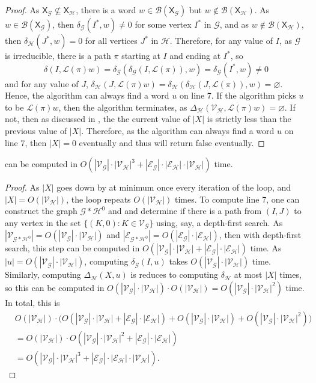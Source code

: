\documentclass[hidelinks]{article}
\newcommand{\Lc}{\mathcal{L}}  %
\newcommand{\Gc}{\mathcal{G}}  %
\newcommand{\Hc}{\mathcal{H}}  %
\newcommand{\Vc}{\mathcal{V}}
\newcommand{\Ec}{\mathcal{E}}
\newcommand{\Bc}{\mathcal{B}}
\newcommand{\shift}[1]{\mathsf{X}_{#1}}
\theoremstyle{definition}
\begin{document}
\begin{proof}
    As \(\shift{\Gc} \nsubseteq \shift{\Hc}\), there is a word \(w \in \Bc(\shift{\Gc})\)
    but \(w \notin \Bc(\shift{\Hc})\). As \(w \in \Bc(\shift{\Gc})\), then \(\delta_\Gc(I^*, w) \neq 0\)
    for some vertex \(I^*\) in \(\Gc\), and as \(w \notin \Bc(\shift{\Hc})\), then 
    \(\delta_\Hc(J^*, w) = 0\) for all vertices \(J^*\) in \(\Hc\). Therefore, for 
    any value of \(I\), as \(\Gc\) is irreducible, there is a path 
    \(\pi\) starting at \(I\) and ending at \(I^*\), so 
    \[\delta(I, \Lc(\pi)w) = \delta_\Gc(\delta_\Gc(I, \Lc(\pi)), w) = \delta_\Gc(I^*, w) \neq 0\]
    and for any value of \(J\), \(\delta_\Hc(J, \Lc(\pi)w) = \delta_\Hc(\delta_\Hc(J, \Lc(\pi)), w) = \varnothing\).
    Hence, the algorithm can always find a word \(u\) on line 7. If the algorithm picks \(u\) to be \(\Lc(\pi)w\), 
    then the algorithm terminates, as \(\Delta_\Hc(\Vc_\Hc, \Lc(\pi)w) = \varnothing\).
    If not, then as discussed in , the the current value of \(|X|\)
    is strictly less than the previous value of \(|X|\). Therefore, as the algorithm 
    can always find a word \(u\) on line 7, then \(|X| = 0\) eventually and 
    thus will return false eventually. 
\end{proof}

\begin{theorem}
     can be computed in \(O(|\Vc_\Gc|\cdot|\Vc_\Hc|^3 + |\Ec_\Gc|\cdot|\Ec_\Hc|\cdot|\Vc_\Hc|)\) time.
\end{theorem}

\begin{proof}
    As \(|X|\) goes down by at minimum once every iteration of the loop, 
    and \(|X| = O(|\Vc_\Hc|)\), the loop repeats \(O(|\Vc_\Hc|)\) times. To compute line 7, 
    one can construct the graph \(\Gc * \Hc^0\) and and determine 
    if there is a path from \((I, J)\) to any vertex in the set 
    \(\{(K, 0) : K \in \Vc_\Gc\}\) using, say, a depth-first search.
    As \(|\Vc_{\Gc * \Hc^0}| = O(|\Vc_\Gc|\cdot|\Vc_\Hc|)\) and 
    \(|\Ec_{\Gc * \Hc^0}| = O(|\Ec_\Gc|\cdot|\Ec_\Hc|)\), then with 
    depth-first search, this step can be computed in \(O(|\Vc_\Gc|\cdot|\Vc_\Hc| + |\Ec_\Gc|\cdot|\Ec_\Hc|)\)
    time. As \(|u| = O(|\Vc_\Gc|\cdot|\Vc_\Hc|)\), computing \(\delta_\Gc(I, u)\) 
    takes \(O(|\Vc_\Gc|\cdot|\Vc_\Hc|)\) time. Similarly, computing 
    \(\Delta_\Hc(X, u)\) is reduces to computing \(\delta_\Hc\) at most \(|X|\) times, so 
    this can be computed in \(O(|\Vc_\Gc|\cdot|\Vc_\Hc|)\cdot O(|\Vc_\Hc|) = O(|\Vc_\Gc| \cdot |\Vc_\Hc|^2)\) time.
    In total, this is 
    \begin{align*}
        & O(|\Vc_\Hc|)\cdot \big( O(|\Vc_\Gc|\cdot|\Vc_\Hc| + |\Ec_\Gc|\cdot|\Ec_\Hc|) + O(|\Vc_\Gc|\cdot|\Vc_\Hc|) + O(|\Vc_\Gc|\cdot|\Vc_\Hc|^2)\big)
        \\ &= O(|\Vc_\Hc|)\cdot O(|\Vc_\Gc|\cdot|\Vc_\Hc|^2 + |\Ec_\Gc|\cdot|\Ec_\Hc|) \\ 
        &= O(|\Vc_\Gc|\cdot|\Vc_\Hc|^3 + |\Ec_\Gc|\cdot|\Ec_\Hc|\cdot|\Vc_\Hc|).
    \end{align*}
\end{proof}
\end{document}
